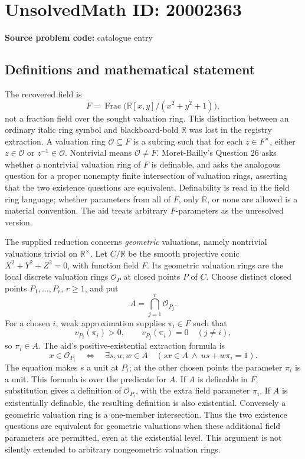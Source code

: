 \documentclass[11pt]{article}
\newcommand{\R}{\mathbb{R}}
\begin{document}
\section*{UnsolvedMath ID: 20002363}
\textbf{Source problem code:} catalogue entry
\subsection{Definitions and mathematical statement}
The recovered field is
\[
 F=\operatorname{Frac}\bigl(\R[x,y]/(x^2+y^2+1)\bigr),
\]
not a fraction field over the sought valuation ring. This distinction between an ordinary italic ring symbol and blackboard-bold \(\R\) was lost in the registry extraction. A valuation ring \(\mathcal O\subseteq F\) is a subring such that for each \(z\in F^\times\), either \(z\in\mathcal O\) or \(z^{-1}\in\mathcal O\). Nontrivial means \(\mathcal O\ne F\). Moret-Bailly's Question 26 asks whether a nontrivial valuation ring of \(F\) is definable, and asks the analogous question for a proper nonempty finite intersection of valuation rings, asserting that the two existence questions are equivalent. Definability is read in the field ring language; whether parameters from all of \(F\), only \(\R\), or none are allowed is a material convention. The aid treats arbitrary \(F\)-parameters as the unresolved version.

The supplied reduction concerns \emph{geometric} valuations, namely nontrivial valuations trivial on \(\R^\times\). Let \(C/\R\) be the smooth projective conic \(X^2+Y^2+Z^2=0\), with function field \(F\). Its geometric valuation rings are the local discrete valuation rings \(\mathcal O_P\) at closed points \(P\) of \(C\). Choose distinct closed points \(P_1,\ldots,P_r\), \(r\ge1\), and put
\[
 A=\bigcap_{j=1}^r\mathcal O_{P_j}.
\]
For a chosen \(i\), weak approximation supplies \(\pi_i\in F\) such that
\[
 v_{P_i}(\pi_i)>0,\qquad v_{P_j}(\pi_i)=0\quad(j\ne i),
\]
so \(\pi_i\in A\). The aid's positive-existential extraction formula is
\[
 x\in\mathcal O_{P_i}\quad\Longleftrightarrow\quad
 \exists s,u,w\in A\quad(sx\in A\ \wedge\ us+w\pi_i=1).
\]
The equation makes \(s\) a unit at \(P_i\); at the other chosen points the parameter \(\pi_i\) is a unit. This formula is over the predicate for \(A\). If \(A\) is definable in \(F\), substitution gives a definition of \(\mathcal O_{P_i}\), with the extra field parameter \(\pi_i\). If \(A\) is existentially definable, the resulting definition is also existential. Conversely a geometric valuation ring is a one-member intersection. Thus the two existence questions are equivalent for geometric valuations when these additional field parameters are permitted, even at the existential level. This argument is not silently extended to arbitrary nongeometric valuation rings.
\end{document}
